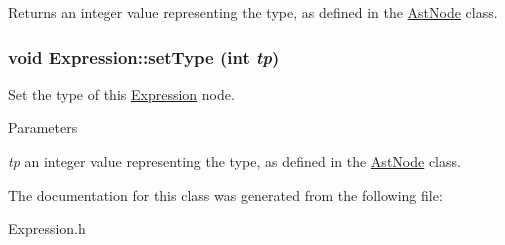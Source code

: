 \begin{DoxyReturn}{Returns}
an integer value representing the type, as defined in the \hyperlink{classAstNode}{AstNode} class. 
\end{DoxyReturn}
\hypertarget{classExpression_ac2a2e67e764dd3ed9733b9cfd3e27f26}{
\subsubsection[{setType}]{\setlength{\rightskip}{0pt plus 5cm}void Expression::setType (int {\em tp})}}
\label{classExpression_ac2a2e67e764dd3ed9733b9cfd3e27f26}
Set the type of this \hyperlink{classExpression}{Expression} node.


\begin{DoxyParams}{Parameters}
\item[{\em tp}]an integer value representing the type, as defined in the \hyperlink{classAstNode}{AstNode} class. \end{DoxyParams}


The documentation for this class was generated from the following file:\begin{DoxyCompactItemize}
\item 
Expression.h\end{DoxyCompactItemize}
